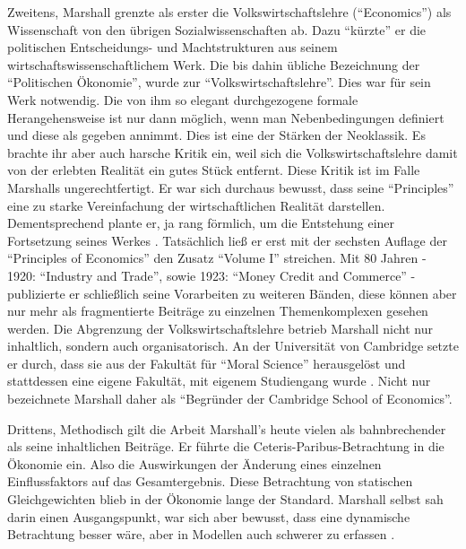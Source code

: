 Zweitens, Marshall grenzte als erster die Volkswirtschaftslehre ("`Economics"') als Wissenschaft von den übrigen Sozialwissenschaften ab. Dazu "`kürzte"' er die politischen Entscheidungs- und Machtstrukturen aus seinem wirtschaftswissenschaftlichem Werk. Die bis dahin übliche Bezeichnung der "`Politischen Ökonomie"', wurde zur "`Volkswirtschaftslehre"'. Dies war für sein Werk notwendig. Die von ihm so elegant durchgezogene formale Herangehensweise ist nur dann möglich, wenn man Nebenbedingungen definiert und diese als gegeben annimmt. Dies ist eine der Stärken der Neoklassik. Es brachte ihr aber auch harsche Kritik ein, weil sich die Volkswirtschaftslehre damit von der erlebten Realität ein gutes Stück entfernt. Diese Kritik ist im Falle Marshalls ungerechtfertigt. Er war sich durchaus bewusst, dass seine "`Principles"' eine zu starke Vereinfachung der wirtschaftlichen Realität darstellen. Dementsprechend plante er, ja rang förmlich, um die Entstehung einer Fortsetzung seines Werkes \parencite[S. 146]{Rieter1989}. Tatsächlich ließ er erst mit der sechsten Auflage der "`Principles of Economics"' den Zusatz "`Volume I"' streichen. Mit 80 Jahren - 1920: "`Industry and Trade"', sowie 1923: "`Money Credit and Commerce"' - publizierte er schließlich seine Vorarbeiten zu weiteren Bänden, diese können aber nur mehr als fragmentierte Beiträge zu einzelnen Themenkomplexen gesehen werden. Die Abgrenzung der Volkswirtschaftslehre betrieb Marshall nicht nur inhaltlich, sondern auch organisatorisch. An der Universität von Cambridge setzte er durch, dass sie aus der Fakultät für "`Moral Science"' herausgelöst und stattdessen eine eigene Fakultät, mit eigenem Studiengang wurde \parencite[S. 141]{Rieter1989}. Nicht nur \textcite[S. 365]{Keynes1924} bezeichnete Marshall daher als "`Begründer der Cambridge School of Economics"'.

Drittens, Methodisch gilt die Arbeit Marshall's heute vielen als bahnbrechender als seine inhaltlichen Beiträge. Er führte die Ceteris-Paribus-Betrachtung in die Ökonomie ein. Also die Auswirkungen der Änderung eines einzelnen Einflussfaktors auf das Gesamtergebnis. Diese Betrachtung von statischen Gleichgewichten blieb in der Ökonomie lange der Standard. Marshall selbst sah darin einen Ausgangspunkt, war sich aber bewusst, dass eine dynamische Betrachtung besser wäre, aber in Modellen auch schwerer zu erfassen \parencite[S. 153]{Rieter1989}.

